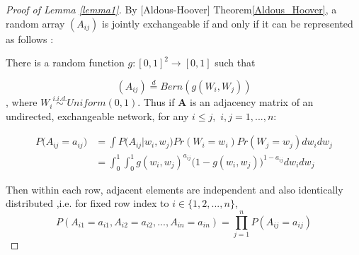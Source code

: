 \documentclass[12pt]{article}
\theoremstyle{definition}
\begin{document}
\begin{proof}[Proof of Lemma \ref{lemma1}]
By [Aldous-Hoover] Theorem\ref{Aldous_Hoover}, a random array $(A_{ij})$ is jointly exchangeable if and only if it can be represented as follows : 

There is a random function $g : [0,1]^2 \rightarrow [0,1]$ such that 

$$(A_{ij})  \stackrel{d}{=} Bern( g(W_{i}, W_{j}))$$
, where $W_{i} \overset{i.i.d.}{\sim} Uniform(0,1)$. Thus if $\mathbf{A}$ is an adjacency matrix of an undirected, exchangeable network, for any $i \leq j,$ $i,j = 1,... , n$:


\begin{equation}
\begin{split}
P \big(  A_{ij} = a_{ij} \big) & = \int P \big( A_{ij} \big| w_{i}, w_{j} \big) Pr(W_{i} = w_{i}) Pr(W_{j} = w_{j}) dw_{i} dw_{j} \\ & = \int_{0}^{1} \int_{0}^{1} g( w_{i},  w_{j})^{a_{ij}} \big( 1- g( w_{i},  w_{j}) \big)^{1-a_{ij}} dw_{i} dw_{j} 
\end{split}
\end{equation}

Then within each row, adjacent elements are independent and also identically distributed ,i.e. for fixed row index to $i \in \{1,2,... , n\}$,
$$P(A_{i1} = a_{i1}, A_{i2} = a_{i2}, ... , A_{in} = a_{in} ) = \prod\limits_{j=1}^{n} P(A_{ij} = a_{ij})$$

\end{proof}
\end{document}
